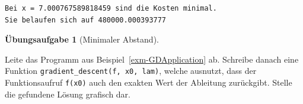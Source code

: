 \documentclass[
  a4paper,
  DIV=11]{scrreprt}
\theoremstyle{definition}
\newtheorem{exercise}{Übungsaufgabe}[chapter]
\theoremstyle{definition}
\theoremstyle{remark}
\begin{document}
\begin{tcolorbox}
\begin{verbatim}
Bei x = 7.000767589818459 sind die Kosten minimal.
Sie belaufen sich auf 480000.000393777
\end{verbatim}

\end{tcolorbox}

\begin{exercise}[Minimaler
Abstand]\protect\hypertarget{exr-MinDistlSolution}{}\label{exr-MinDistlSolution}

Leite das Programm aus Beispiel~\ref{exm-GDApplication} ab. Schreibe
danach eine Funktion \texttt{gradient\_descent(f,\ x0,\ lam)}, welche
ausnutzt, dass der Funktionsaufruf \texttt{f(x0)} auch den exakten Wert
der Ableitung zurückgibt. Stelle die gefundene Lösung grafisch dar.

\end{exercise}
\end{document}

